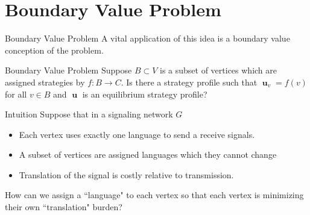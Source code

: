 \documentclass{beamer}
\DeclareMathOperator{\uu}{\mathbf{u}}
\begin{document}
\section{Boundary Value Problem}
\begin{frame}{Boundary Value Problem}
	A vital application of this idea is a boundary value conception of the problem.
	\begin{block}{Boundary Value Problem}
		Suppose $B\subset V$ is a subset of vertices which are assigned strategies by $f:B\rightarrow C$. Is there a strategy profile such that $\uu_v=f(v)$ for all $v\in B$ and $\uu$ is an equilibrium strategy profile?
	\end{block}
\end{frame}
\begin{frame}{Intuition}
	Suppose that in  a signaling network $G$
	\begin{itemize}
		\item Each vertex uses exactly one language to send a receive signals. 
		\item A subset of vertices are assigned languages which they cannot change
		\item Translation of the signal is costly relative to transmission. 
	\end{itemize}

	How can we assign a ``language" to each vertex so that each vertex is minimizing their own ``translation" burden?
\end{frame}
\end{document}
